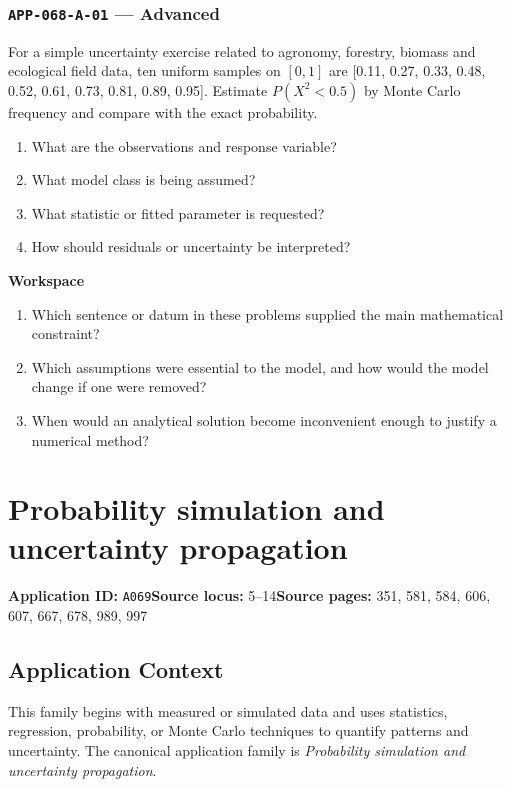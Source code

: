\documentclass[11pt]{book}
\newcommand{\pid}[1]{\texttt{#1}}
\newcommand{\workspace}{\par\vspace{0.7in}\hrulefill\par\vspace{0.55in}\hrulefill\par}
\begin{document}
\subsection*{\pid{APP-068-A-01} — Advanced}
\begin{problembox}
For a simple uncertainty exercise related to agronomy, forestry, biomass and ecological field data, ten uniform samples on $[0,1]$ are [0.11, 0.27, 0.33, 0.48, 0.52, 0.61, 0.73, 0.81, 0.89, 0.95]. Estimate $P(X^2<0.5)$ by Monte Carlo frequency and compare with the exact probability.
\end{problembox}
\begin{promptbox}\begin{enumerate}
\item What are the observations and response variable?
\item What model class is being assumed?
\item What statistic or fitted parameter is requested?
\item How should residuals or uncertainty be interpreted?
\end{enumerate}\end{promptbox}
\textbf{Workspace}\workspace
\begin{reflectionbox}\begin{enumerate}
\item Which sentence or datum in these problems supplied the main mathematical constraint?
\item Which assumptions were essential to the model, and how would the model change if one were removed?
\item When would an analytical solution become inconvenient enough to justify a numerical method?
\end{enumerate}\end{reflectionbox}
\chapter{Probability simulation and uncertainty propagation}\label{app:A069}
\textbf{Application ID:} \pid{A069}\quad \textbf{Source locus:} 5–14\quad \textbf{Source pages:} 351, 581, 584, 606, 607, 667, 678, 989, 997
\section*{Application Context}
This family begins with measured or simulated data and uses statistics, regression, probability, or Monte Carlo techniques to quantify patterns and uncertainty. The canonical application family is \emph{Probability simulation and uncertainty propagation}.
\end{document}
